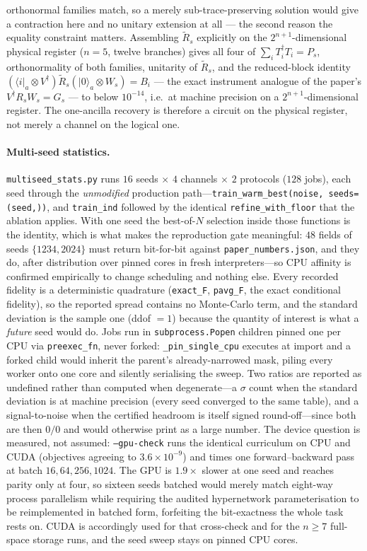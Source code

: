 \documentclass[aps,prxquantum,reprint,superscriptaddress]{revtex4-2}
\newcommand{\ket}[1]{\lvert #1\rangle}
\newcommand{\bra}[1]{\langle #1\rvert}
\begin{document}
orthonormal families match, so a merely sub-trace-preserving solution would give a
contraction here and no unitary extension at all --- the second reason the equality
constraint matters. Assembling $\tilde R_s$ explicitly on the $2^{n+1}$-dimensional
physical register ($n{=}5$, twelve branches) gives all four of
$\sum_iT_i^\dagger T_i=P_s$, orthonormality of both families, unitarity of
$\tilde R_s$, and the reduced-block identity
$(\bra i_a\otimes V^\dagger)\tilde R_s(\ket0_a\otimes W_s)=B_i$ --- the exact
instrument analogue of the paper's $V^\dagger R_sW_s=G_s$ --- to below
$10^{-14}$, i.e.\ at machine precision on a $2^{n+1}$-dimensional register.
The one-ancilla recovery is therefore a circuit on the physical register, not
merely a channel on the logical one.

\paragraph{Multi-seed statistics.}
\texttt{multiseed\_stats.py} runs $16$ seeds $\times$ $4$ channels $\times$ $2$
protocols ($128$ jobs), each seed through the \emph{unmodified} production
path---\texttt{train\_warm\_best(noise, seeds=(seed,))}, and \texttt{train\_ind}
followed by the identical \texttt{refine\_with\_floor} that the ablation
applies. With one seed the best-of-$N$ selection inside those functions is the
identity, which is what makes the reproduction gate meaningful: $48$ fields of
seeds $\{1234,2024\}$ must return bit-for-bit against
\texttt{paper\_numbers.json}, and they do, after distribution over pinned cores
in fresh interpreters---so CPU affinity is confirmed empirically to change
scheduling and nothing else. Every recorded fidelity is a deterministic
quadrature (\texttt{exact\_F}, \texttt{pavg\_F}, the exact conditional
fidelity), so the reported spread contains no Monte-Carlo term, and the standard
deviation is the sample one (ddof $=1$) because the quantity of interest is what
a \emph{future} seed would do. Jobs run in \texttt{subprocess.Popen} children
pinned one per CPU via \texttt{preexec\_fn}, never forked:
\texttt{\_pin\_single\_cpu} executes at import and a forked child would inherit
the parent's already-narrowed mask, piling every worker onto one core and
silently serialising the sweep. Two ratios are reported as undefined rather than
computed when degenerate---a $\sigma$ count when the standard deviation is at
machine precision (every seed converged to the same table), and a
signal-to-noise when the certified headroom is itself signed round-off---since
both are then $0/0$ and would otherwise print as a large number. The device
question is measured, not assumed: \texttt{--gpu-check} runs the identical
curriculum on CPU and CUDA (objectives agreeing to $3.6\times10^{-9}$) and times
one forward--backward pass at batch $16,64,256,1024$. The GPU is $1.9\times$
slower at one seed and reaches parity only at four, so sixteen seeds batched
would merely match eight-way process parallelism while requiring the audited
hypernetwork parameterisation to be reimplemented in batched form, forfeiting
the bit-exactness the whole task rests on. CUDA is accordingly used for that
cross-check and for the $n\ge7$ full-space storage runs, and the seed sweep
stays on pinned CPU cores.
\end{document}
